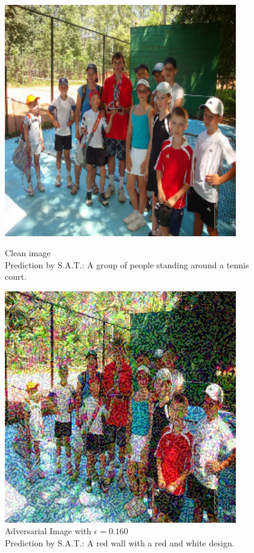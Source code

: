 \begin{figure}[ht]
    \centering
    \begin{minipage}{0.45\textwidth}
        \centering
        \includegraphics[width=0.9\textwidth]{figures/fast_method_group_of_people/group_of_people_0.000.png} %
        \caption*{Clean image\\Prediction by S.A.T.: A group of people standing around a tennis court.}
    \end{minipage}\hfill
    \begin{minipage}{0.45\textwidth}
        \centering
        \includegraphics[width=0.9\textwidth]{figures/fast_method_group_of_people/group_of_people_0.160.png} %
        \caption*{Adversarial Image with $\epsilon=0.160$\\Prediction by S.A.T.: A red wall with a red and white design.}
    \end{minipage}
\end{figure}

